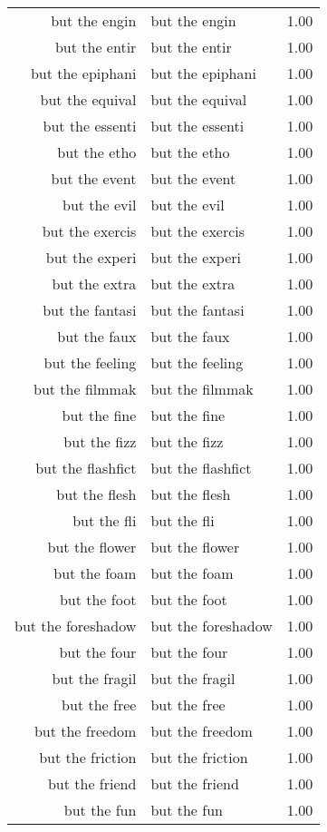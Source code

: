 \begin{table}[ht]
\begin{tabular}{rlr}
  but the engin & but the engin & 1.00 \\ 
  but the entir & but the entir & 1.00 \\ 
  but the epiphani & but the epiphani & 1.00 \\ 
  but the equival & but the equival & 1.00 \\ 
  but the essenti & but the essenti & 1.00 \\ 
  but the etho & but the etho & 1.00 \\ 
  but the event & but the event & 1.00 \\ 
  but the evil & but the evil & 1.00 \\ 
  but the exercis & but the exercis & 1.00 \\ 
  but the experi & but the experi & 1.00 \\ 
  but the extra & but the extra & 1.00 \\ 
  but the fantasi & but the fantasi & 1.00 \\ 
  but the faux & but the faux & 1.00 \\ 
  but the feeling & but the feeling & 1.00 \\ 
  but the filmmak & but the filmmak & 1.00 \\ 
  but the fine & but the fine & 1.00 \\ 
  but the fizz & but the fizz & 1.00 \\ 
  but the flashfict & but the flashfict & 1.00 \\ 
  but the flesh & but the flesh & 1.00 \\ 
  but the fli & but the fli & 1.00 \\ 
  but the flower & but the flower & 1.00 \\ 
  but the foam & but the foam & 1.00 \\ 
  but the foot & but the foot & 1.00 \\ 
  but the foreshadow & but the foreshadow & 1.00 \\ 
  but the four & but the four & 1.00 \\ 
  but the fragil & but the fragil & 1.00 \\ 
  but the free & but the free & 1.00 \\ 
  but the freedom & but the freedom & 1.00 \\ 
  but the friction & but the friction & 1.00 \\ 
  but the friend & but the friend & 1.00 \\ 
  but the fun & but the fun & 1.00 \\ 

\end{tabular}
\end{table}
